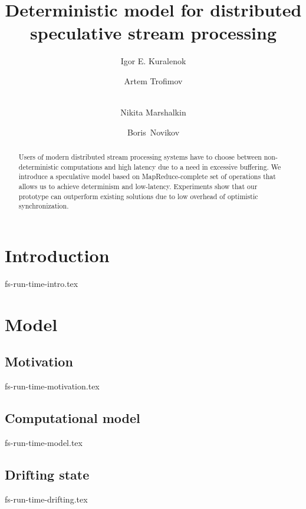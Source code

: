 \documentclass{llncs}
\begin{document}
\title {Deterministic model for distributed speculative stream processing}
\author{Igor E. Kuralenok
       \and Artem Trofimov
       \and \\Nikita Marshalkin
      \and Boris~Novikov}

\maketitle

\begin{abstract}
Users of modern distributed stream processing systems have to choose between non-deterministic computations and high latency due to a need in excessive buffering. We introduce a speculative model based on MapReduce-complete set of operations that allows us to achieve determinism and low-latency. Experiments show that our prototype can outperform existing solutions due to low overhead of optimistic synchronization.

\end {abstract}

\section {Introduction}
 {fs-run-time-intro.tex}

\section {Model}
\label {fs-model}

\subsection {Motivation}
 {fs-run-time-motivation.tex}

\subsection {Computational model}
 {fs-run-time-model.tex}

 \subsection{Drifting state}
  {fs-run-time-drifting.tex}
\end{document}

